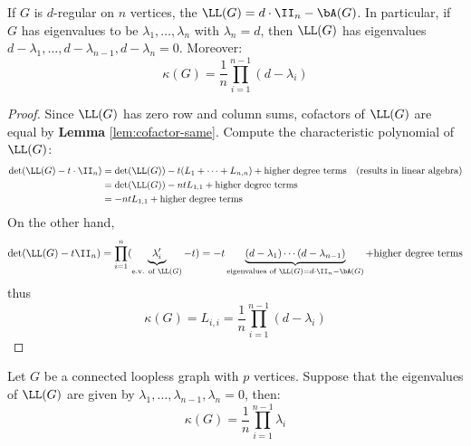 \begin{proposition}
	If \( G \) is \( d \)-regular on \( n \) vertices, the \( \LL(G) = d \cdot \II_{n} - \bA(G) \). In particular, if \( G \) has eigenvalues to be \( \lambda_1, \ldots, \lambda_n \) with \( \lambda_n = d \), then \( \LL(G) \) has eigenvalues \( d-\lambda_1, \ldots, d-\lambda_{n-1}, d-\lambda_n = 0 \). Moreover:
	\[
		\kappa(G) = \frac{1}{n} \prod_{i=1}^{n-1} (d-\lambda_i)
	\]
\end{proposition}

\begin{proof}
	Since \( \LL(G) \) has zero row and column sums, cofactors of \( \LL(G) \) are equal by \textbf{Lemma} \ref{lem:cofactor-same}. Compute the characteristic polynomial of \( \LL(G) \):
	\[
		\begin{aligned}
			\det(\LL(G) - t\cdot \II_n) & = \det(\LL(G)) - t(L_1 + \cdots + L_{n,n}) + \text{higher degree terms}\quad (\text{results in linear algebra}) \\
			                            & = \det(\LL(G)) - nt L_{1,1} + \text{higher degree terms}                                                        \\
			                            & = -ntL_{1,1} + \text{higher degree terms}
		\end{aligned}
	\]
	On the other hand,
	\[
		\det(\LL(G) - t\II_n) = \prod_{i=1}^n (\underbrace{\lambda'_i}_{\text{e.v. of } \LL(G)} - t) = -t\underbrace{(d-\lambda_1) \cdots (d-\lambda_{n-1})}_{\text{eigenvalues of } \LL(G) = d \cdot \II_n - \bA(G)} + \text{higher degree terms}
	\]
	thus
	\[
		\kappa(G) = L_{i,i} = \frac{1}{n} \prod_{i=1}^{n-1} (d-\lambda_i)
	\]
\end{proof}

\begin{corollary}
	Let \( G \) be a connected loopless graph with \( p \) vertices. Suppose that the eigenvalues of \( \LL(G) \) are given by \( \lambda_1, \ldots, \lambda_{n-1}, \lambda_n = 0 \), then:
	\[
		\kappa(G) = \frac{1}{n}\prod_{i=1}^{n-1}\lambda_i
	\]
\end{corollary}

